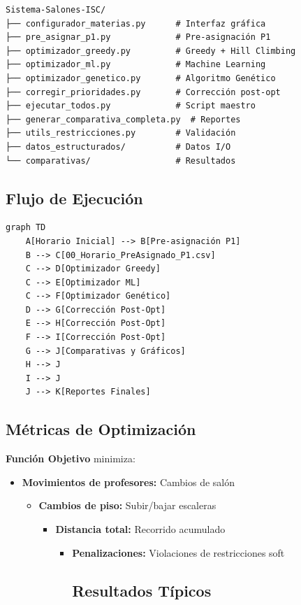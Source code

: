 \documentclass[algorithms,article,submit,pdftex]{Definitions/mdpi}
\begin{document}
\begin{itemize}
\begin{itemize}
\begin{itemize}
\begin{itemize}
\begin{enumerate}
\begin{itemize}
{\begin{itemize}
\begin{itemize}
\begin{enumerate}
\begin{itemize}
\begin{enumerate}
\begin{itemize}
\begin{verbatim}
Sistema-Salones-ISC/
├── configurador_materias.py      # Interfaz gráfica
├── pre_asignar_p1.py             # Pre-asignación P1
├── optimizador_greedy.py         # Greedy + Hill Climbing
├── optimizador_ml.py             # Machine Learning
├── optimizador_genetico.py       # Algoritmo Genético
├── corregir_prioridades.py       # Corrección post-opt
├── ejecutar_todos.py             # Script maestro
├── generar_comparativa_completa.py  # Reportes
├── utils_restricciones.py        # Validación
├── datos_estructurados/          # Datos I/O
└── comparativas/                 # Resultados
\end{verbatim}


\subsection{Flujo de Ejecución}

\begin{verbatim}
graph TD
    A[Horario Inicial] --> B[Pre-asignación P1]
    B --> C[00_Horario_PreAsignado_P1.csv]
    C --> D[Optimizador Greedy]
    C --> E[Optimizador ML]
    C --> F[Optimizador Genético]
    D --> G[Corrección Post-Opt]
    E --> H[Corrección Post-Opt]
    F --> I[Corrección Post-Opt]
    G --> J[Comparativas y Gráficos]
    H --> J
    I --> J
    J --> K[Reportes Finales]
\end{verbatim}


\subsection{Métricas de Optimización}

\textbf{Función Objetivo} minimiza:

\begin{itemize}
\item \textbf{Movimientos de profesores:} Cambios de salón
\begin{itemize}
\item \textbf{Cambios de piso:} Subir/bajar escaleras
\begin{itemize}
\item \textbf{Distancia total:} Recorrido acumulado
\begin{itemize}
\item \textbf{Penalizaciones:} Violaciones de restricciones soft

\subsection{Resultados Típicos}



\end{itemize}
\end{itemize}
\end{itemize}
\end{itemize}
\end{itemize}
\end{enumerate}
\end{itemize}
\end{enumerate}
\end{itemize}
\end{itemize}}
\end{itemize}
\end{enumerate}
\end{itemize}
\end{itemize}
\end{itemize}
\end{itemize}
\end{document}
